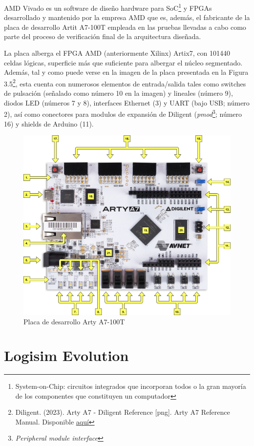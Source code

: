 AMD Vivado es un software de diseño hardware para SoC\footnote{System-on-Chip: circuitos integrados que incorporan todos o la gran mayoría de los componentes que constituyen un computador} y FPGAs desarrollado y mantenido por la empresa AMD que es, además, el fabricante de la placa de desarrollo Artit A7-100T empleada en las pruebas llevadas a cabo como parte del proceso de verificación final de la arquitectura diseñada.

La placa alberga el FPGA AMD (anteriormente Xilinx) Artix7, con 101440 celdas lógicas\cite{arty}, superficie más que suficiente para albergar el núcleo segmentado. Además, tal y como puede verse en la imagen de la placa presentada en la Figura 3.5\footnote{Diligent. (2023). Arty A7 - Diligent Reference [png]. Arty A7 Reference Manual. Disponible \href{https://microbit.org/es-es/get-started/user-guide/overview/}{aquí}}, esta cuenta con numerosos elementos de entrada/salida tales como switches de pulsación (señalado como número 10 en la imagen) y lineales (número 9), diodos LED (números 7 y 8), interfaces Ethernet (3) y UART (bajo USB; número 2), así como conectores para modulos de expansión de Diligent (\textit{pmod}\footnote{\textit{Peripheral module interface}}; número 16) y shields de Arduino (11).

\vspace{+0.2cm}
\begin{figure}[h]
  \centering
  \includegraphics[width=0.6 \linewidth]{res/img/artyA7.png}
  \caption{Placa de desarrollo Arty A7-100T}
\end{figure}

\vspace{-0.4cm}

\section{Logisim Evolution}

